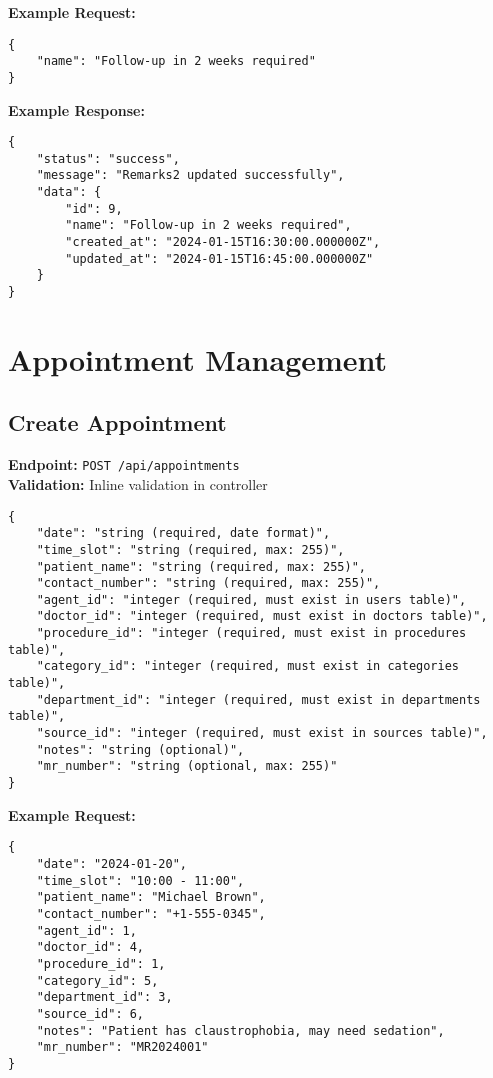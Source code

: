 \documentclass[12pt,a4paper]{article}
\begin{document}
\textbf{Example Request:}
\begin{lstlisting}[caption=Update Remarks2 Example Request]
{
    "name": "Follow-up in 2 weeks required"
}
\end{lstlisting}

\textbf{Example Response:}
\begin{lstlisting}[caption=Update Remarks2 Example Response]
{
    "status": "success",
    "message": "Remarks2 updated successfully",
    "data": {
        "id": 9,
        "name": "Follow-up in 2 weeks required",
        "created_at": "2024-01-15T16:30:00.000000Z",
        "updated_at": "2024-01-15T16:45:00.000000Z"
    }
}
\end{lstlisting}

\section{Appointment Management}

\subsection{Create Appointment}
\textbf{Endpoint:} \texttt{POST /api/appointments}\\
\textbf{Validation:} Inline validation in controller

\begin{lstlisting}[caption=Create Appointment Request Body]
{
    "date": "string (required, date format)",
    "time_slot": "string (required, max: 255)",
    "patient_name": "string (required, max: 255)",
    "contact_number": "string (required, max: 255)",
    "agent_id": "integer (required, must exist in users table)",
    "doctor_id": "integer (required, must exist in doctors table)",
    "procedure_id": "integer (required, must exist in procedures table)",
    "category_id": "integer (required, must exist in categories table)",
    "department_id": "integer (required, must exist in departments table)",
    "source_id": "integer (required, must exist in sources table)",
    "notes": "string (optional)",
    "mr_number": "string (optional, max: 255)"
}
\end{lstlisting}

\textbf{Example Request:}
\begin{lstlisting}[caption=Create Appointment Example Request]
{
    "date": "2024-01-20",
    "time_slot": "10:00 - 11:00",
    "patient_name": "Michael Brown",
    "contact_number": "+1-555-0345",
    "agent_id": 1,
    "doctor_id": 4,
    "procedure_id": 1,
    "category_id": 5,
    "department_id": 3,
    "source_id": 6,
    "notes": "Patient has claustrophobia, may need sedation",
    "mr_number": "MR2024001"
}
\end{lstlisting}
\end{document}
